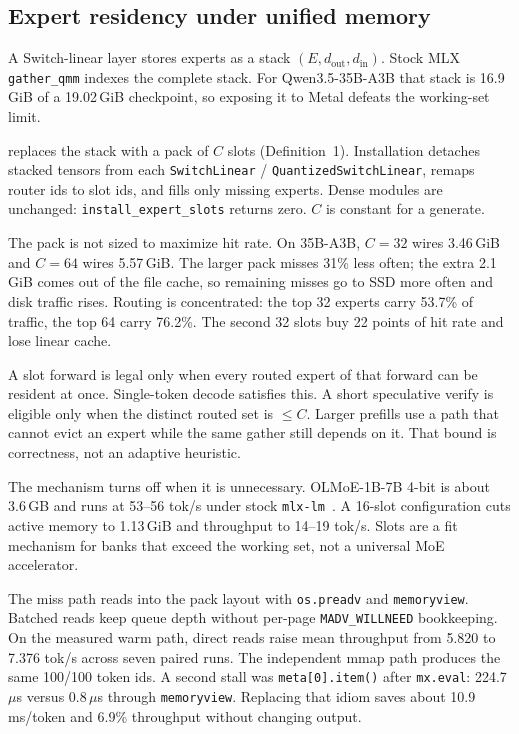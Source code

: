 \subsection{Expert residency under unified memory}
\label{sec:moe-design}

A Switch-linear layer stores experts as a stack $(E,d_{\mathrm{out}},d_{\mathrm{in}})$. Stock MLX \texttt{gather\_qmm} indexes the complete stack. For Qwen3.5-35B-A3B that stack is 16.9\,GiB of a 19.02\,GiB checkpoint, so exposing it to Metal defeats the working-set limit.

\slotbank{} replaces the stack with a pack of $C$ slots (Definition~1). Installation detaches stacked tensors from each \texttt{SwitchLinear} / \texttt{QuantizedSwitchLinear}, remaps router ids to slot ids, and fills only missing experts. Dense modules are unchanged: \texttt{install\_expert\_slots} returns zero. $C$ is constant for a generate.

The pack is not sized to maximize hit rate. On 35B-A3B, $C{=}32$ wires 3.46\,GiB and $C{=}64$ wires 5.57\,GiB. The larger pack misses 31\% less often; the extra 2.1\,GiB comes out of the file cache, so remaining misses go to SSD more often and disk traffic rises. Routing is concentrated: the top 32 experts carry 53.7\% of traffic, the top 64 carry 76.2\%. The second 32 slots buy 22 points of hit rate and lose linear cache.

A slot forward is legal only when every routed expert of that forward can be resident at once. Single-token decode satisfies this. A short speculative verify is eligible only when the distinct routed set is $\le C$. Larger prefills use a path that cannot evict an expert while the same gather still depends on it. That bound is correctness, not an adaptive heuristic.

The mechanism turns off when it is unnecessary. OLMoE-1B-7B 4-bit is about 3.6\,GB and runs at 53--56 tok/s under stock \texttt{mlx-lm}~\citep{olmoe}. A 16-slot configuration cuts active memory to 1.13\,GiB and throughput to 14--19 tok/s. Slots are a fit mechanism for banks that exceed the working set, not a universal MoE accelerator.

The miss path reads into the pack layout with \texttt{os.preadv} and \texttt{memoryview}. Batched reads keep queue depth without per-page \texttt{MADV\_WILLNEED} bookkeeping. On the measured warm path, direct reads raise mean throughput from 5.820 to 7.376 tok/s across seven paired runs. The independent mmap path produces the same 100/100 token ids. A second stall was \texttt{meta[0].item()} after \texttt{mx.eval}: 224.7\,$\mu$s versus 0.8\,$\mu$s through \texttt{memoryview}. Replacing that idiom saves about 10.9\,ms/token and 6.9\% throughput without changing output.

